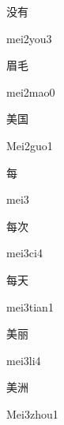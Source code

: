 \begin{verbete}{没有}
\begin{pronuncia}{mei2you3}
\end{pronuncia}
\end{verbete}

\begin{verbete}{眉毛}
\begin{pronuncia}{mei2mao0}
\end{pronuncia}
\end{verbete}

\begin{verbete}{美国}
\begin{pronuncia}{Mei2guo1}
\end{pronuncia}
\end{verbete}

\begin{verbete}[mei3]{每}
\begin{pronuncia}{mei3}
\end{pronuncia}
\end{verbete}

\begin{verbete}[mei3ci4]{每次}
\begin{pronuncia}{mei3ci4}
\end{pronuncia}
\end{verbete}

\begin{verbete}{每天}
\begin{pronuncia}{mei3tian1}
\end{pronuncia}
\end{verbete}

\begin{verbete}[mei3li4]{美丽}
\begin{pronuncia}{mei3li4}
\end{pronuncia}
\end{verbete}

\begin{verbete}{美洲}
\begin{pronuncia}{Mei3zhou1}
\end{pronuncia}
\end{verbete}

